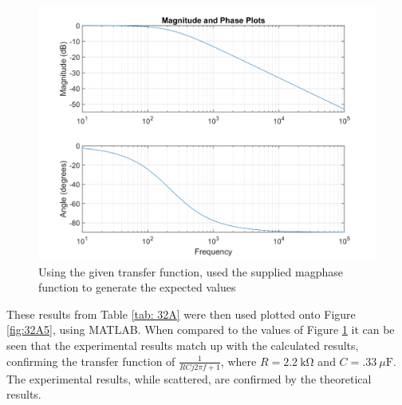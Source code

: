 \documentclass[10pt]{article}
\begin{document}
\begin{center}
	\begin{figure} [H]
		\centering
		\includegraphics[scale=0.4]{images/matlabRC.png}
		\caption{Using the given transfer function, used the supplied magphase function to generate the expected values}
		\label{fig:32A6}
	\end{figure}
\end{center}
These results from Table \ref{tab: 32A} were then used plotted onto Figure \ref{fig:32A5}, using MATLAB. When compared to the values of Figure \ref{fig:32A6} it can be seen that the experimental results match up with the calculated results, confirming the transfer function of $\frac{1}{RCj2\pi f+1}$, where $R = \SI{2.2}{\kilo\ohm}$ and $C = \SI{.33}{\mu\farad}$. The experimental results, while scattered, are confirmed by the theoretical results. 
\end{document}
